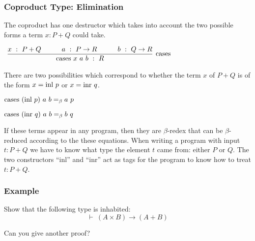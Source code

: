 \documentclass{beamer}
\theoremstyle{indentDefn} \newtheorem{defn}[]{Definition}
\begin{document}
\begin{frame}
  \frametitle{Coproduct Type: Elimination}

  The coproduct has one destructor which takes into account the two possible forms a term $x : P + Q$ could take. 
  
  \vspace{5mm}

  \begin{center}
    $\begin{array}{c}
      \infer[\sumElim]{\sumElim x \ a \ b \ : \ R}{x \ : \ P + Q \quad & \quad a \ : \ P \to R \quad & \quad  b \ : \ Q \to R}
    \end{array}$
  \end{center}

\vspace{5mm}

  There are two possibilities which correspond to whether the term $x$ of $P+Q$ is of the form $x = \text{inl } p$ or $x = \text{inr } q$. 

  \begin{center}
    $\sumElim (\inl p) \ a \ b =_{\beta} a \ p$ 

    $\sumElim (\inr q) \ a \ b =_{\beta} b \ q$
  \end{center}

  If these terms appear in any program, then they are $\beta$-redex that can be $\beta$-reduced according to the these equations. When writing a program with input $t : P+Q$ we have to know what type the element $t$ came from: either $P$ or $Q$. The two constructors ``inl'' and ``inr'' act as tags for the program to know how to treat $t : P+Q$. 
\end{frame}

\begin{frame}
  \frametitle{Example}

  Show that the following type is inhabited:
  $$ \vdash \ (A \times B) \to (A + B)$$
  

  \vspace{50mm}
  Can you give another proof?
\end{frame}



\end{document}
